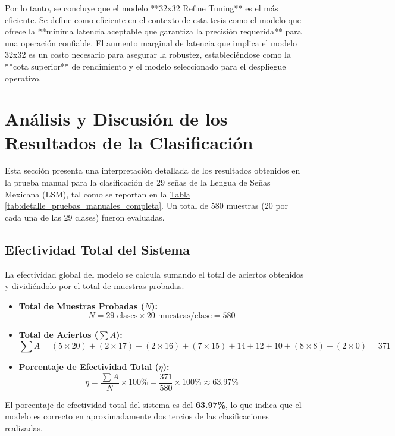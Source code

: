 Por lo tanto, se concluye que el modelo **32x32 Refine Tuning** es el más eficiente. Se define como eficiente en el contexto de esta tesis como el modelo que ofrece la **mínima latencia aceptable que garantiza la precisión requerida** para una operación confiable. El aumento marginal de latencia que implica el modelo 32x32 es un costo necesario para asegurar la robustez, estableciéndose como la **cota superior** de rendimiento y el modelo seleccionado para el despliegue operativo.

\section{Análisis y Discusión de los Resultados de la Clasificación}
\label{sec:analisis_resultados}

Esta sección presenta una interpretación detallada de los resultados obtenidos en la prueba manual para la clasificación de 29 señas de la Lengua de Señas Mexicana (LSM), tal como se reportan en la \hyperref[tab:detalle_pruebas_manuales_completa]{Tabla \ref{tab:detalle_pruebas_manuales_completa}}. Un total de 580 muestras (20 por cada una de las 29 clases) fueron evaluadas.

\subsection{Efectividad Total del Sistema}

La efectividad global del modelo se calcula sumando el total de aciertos obtenidos y dividiéndolo por el total de muestras probadas.

\begin{itemize}
    \item \textbf{Total de Muestras Probadas ($N$):}
    $$N = 29 \text{ clases} \times 20 \text{ muestras/clase} = 580$$
    \item \textbf{Total de Aciertos ($\sum A$):}
    $$\sum A = (5 \times 20) + (2 \times 17) + (2 \times 16) + (7 \times 15) + 14 + 12 + 10 + (8 \times 8) + (2 \times 0) = 371$$
    \item \textbf{Porcentaje de Efectividad Total ($\eta$):}
    $$\eta = \frac{\sum A}{N} \times 100\% = \frac{371}{580} \times 100\% \approx 63.97\%$$
\end{itemize}

El porcentaje de efectividad total del sistema es del \textbf{63.97\%}, lo que indica que el modelo es correcto en aproximadamente dos tercios de las clasificaciones realizadas.

